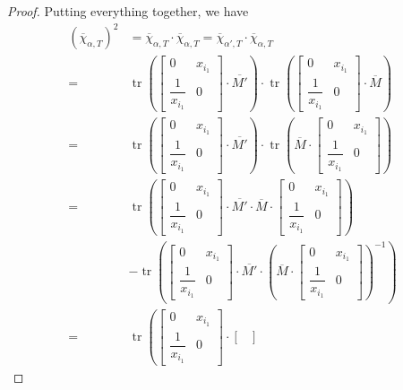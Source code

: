 \documentclass[pdftex]{sigma}
\numberwithin{equation}{section}
\theoremstyle{definition}
\begin{document}
\begin{proof}
 Putting everything together, we have
 \begin{align*}
 (\overline{\chi}_{\alpha, T})^2 &=\overline{\chi}_{\alpha, T}\cdot \overline{\chi}_{\alpha, T}=\overline{\chi}_{\alpha', T}\cdot \overline{\chi}_{\alpha, T}\\
={}&\operatorname{tr}\left(
\begin{bmatrix}
 0 & x_{i_1}\\
 \dfrac{1}{x_{i_1}} & 0
\end{bmatrix}
\cdot \overline{M'}\right)\cdot \operatorname{tr}\left(
\begin{bmatrix}
 0 & x_{i_1}\\
 \dfrac{1}{x_{i_1}} & 0
\end{bmatrix}
\cdot \overline{M}\right)\\
={}&\operatorname{tr}\left(
\begin{bmatrix}
 0 & x_{i_1}\\
 \dfrac{1}{x_{i_1}} & 0
\end{bmatrix}
\cdot \overline{M'}\right)\cdot \operatorname{tr}\left(\overline{M}\cdot
\begin{bmatrix}
 0 & x_{i_1}\\
 \dfrac{1}{x_{i_1}} & 0
\end{bmatrix}\right)\\
={}&\operatorname{tr}\left(
\begin{bmatrix}
 0 & x_{i_1}\\
 \dfrac{1}{x_{i_1}} & 0
\end{bmatrix}
\cdot \overline{M'}\cdot\overline{M}\cdot
\begin{bmatrix}
 0 & x_{i_1}\\
 \dfrac{1}{x_{i_1}} & 0
\end{bmatrix}\right)\\&-\operatorname{tr}\left(
\begin{bmatrix}
 0 & x_{i_1}\\
 \dfrac{1}{x_{i_1}} & 0
\end{bmatrix}
\cdot \overline{M'}\cdot \left(\overline{M}\cdot \begin{bmatrix}
 0 & x_{i_1}\\
 \dfrac{1}{x_{i_1}} & 0
\end{bmatrix}
\right)^{-1}\right)\\
={}&\operatorname{tr}\left(\begin{bmatrix}
 0 & x_{i_1}\\
 \dfrac{1}{x_{i_1}} & 0
\end{bmatrix}\cdot
\begin{bmatrix}

\end{bmatrix}
\end{align*}
\end{proof}
\end{document}
